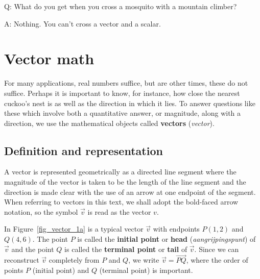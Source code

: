 \begin{savequote}[75mm]
Q: What do you get when you cross a mosquito with a mountain climber?

A: Nothing. You can't cross a vector and a scalar.
\end{savequote}

\chapter{Vector math}
\label{chap_vector}
\graphicspath{{figures/Vector/}}

For many applications, real numbers suffice, but are other times, these do not suffice.  Perhaps it is important to know, for instance, how close the nearest cuckoo's nest is as well as the direction in which it lies.  To answer questions like these which involve both a quantitative answer, or magnitude, along with a direction, we use the mathematical objects called \textbf{vectors} (\textit{vector}).  


\section{Definition and representation}
\label{sec_vect_repre}
 A vector is represented geometrically as a directed line segment where the magnitude of the vector is taken to be the length of the line segment and the direction is made clear with the use of an arrow at one endpoint of the segment.  When referring to vectors in this text, we shall adopt the bold-faced arrow notation, so the symbol  $\vec{v}$ is read as the vector $v$.


In Figure~\ref{fig_vector_1a} is a typical vector $\vec{v}$ with endpoints $P\left(1, 2\right)$ and $Q\left(4, 6\right)$. The point $P$  is called the \textbf{initial point} or \textbf{head} (\textit{aangrijpingspunt}) of  $\vec{v}$ and the point $Q$ is called the \textbf{terminal point} or \textbf{tail} of  $\vec{v}$.   Since we can reconstruct $\vec{v}$ completely from $P$ and $Q$, we write $\vec{v} = \overrightarrow{PQ}$, where the order of points $P$ (initial point) and $Q$ (terminal point) is important.


